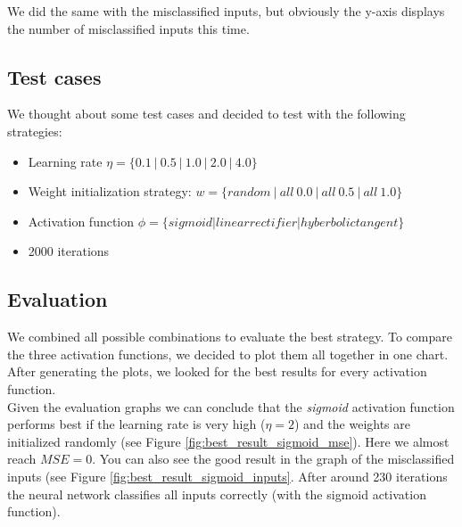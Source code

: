 \documentclass{article}
\begin{document}
We did the same with the misclassified inputs, but obviously the y-axis displays the number of misclassified inputs this time.

\subsection{Test cases}

We thought about some test cases and decided to test with the following strategies:

\begin{itemize}
\item{Learning rate $\eta = \{0.1\ |\ 0.5\ |\ 1.0\ |\ 2.0\ |\ 4.0 \}$}
\item{Weight initialization strategy: $w = \{ random\ |\ all\ 0.0\ |\ all\ 0.5\ |\ all\ 1.0\}$}
\item{Activation function $\phi = \{sigmoid | linear rectifier | hyberbolic tangent\}$}
\item{2000 iterations}
\end{itemize}



\subsection{Evaluation}
We combined all possible combinations to evaluate the best strategy.
To compare the three activation functions, we decided to plot them all together in one chart.
After generating the plots, we looked for the best results for every activation function.
\\

Given the evaluation graphs we can conclude that the \emph{sigmoid} activation function performs best if the learning rate is very high ($\eta = 2$) and the weights are initialized randomly (see Figure \ref{fig:best_result_sigmoid_mse}).  Here we almost reach $MSE = 0$. You can also see the good result in the graph of the misclassified inputs (see Figure \ref{fig:best_result_sigmoid_inputs}. After around 230 iterations the neural network classifies all inputs correctly (with the sigmoid activation function).
\end{document}
